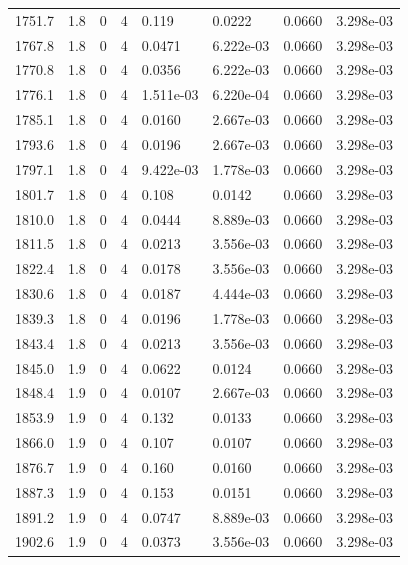 \documentclass[preview]{standalone}
\begin{document}
{{{{{{{{{{\begin{tabular}{L{1.2cm}C{1.2cm} C{0.3cm}C{0.5cm} C{1.4cm}C{1.4cm} C{1.4cm}C{1.4cm}}
  1751.7  &   1.8  & 0     &  4 &  0.119  & 0.0222  & 0.0660 &  3.298e-03   \\ 
  1767.8  &   1.8  & 0     &  4 &  0.0471  & 6.222e-03  & 0.0660 &  3.298e-03   \\ 
  1770.8  &   1.8  & 0     &  4 &  0.0356  & 6.222e-03  & 0.0660 &  3.298e-03   \\ 
  1776.1  &   1.8  & 0     &  4 &  1.511e-03  & 6.220e-04  & 0.0660 &  3.298e-03   \\ 
  1785.1  &   1.8  & 0     &  4 &  0.0160  & 2.667e-03  & 0.0660 &  3.298e-03   \\ 
  1793.6  &   1.8  & 0     &  4 &  0.0196  & 2.667e-03  & 0.0660 &  3.298e-03   \\ 
  1797.1  &   1.8  & 0     &  4 &  9.422e-03  & 1.778e-03  & 0.0660 &  3.298e-03   \\ 
  1801.7  &   1.8  & 0     &  4 &  0.108  & 0.0142  & 0.0660 &  3.298e-03   \\ 
  1810.0  &   1.8  & 0     &  4 &  0.0444  & 8.889e-03  & 0.0660 &  3.298e-03   \\ 
  1811.5  &   1.8  & 0     &  4 &  0.0213  & 3.556e-03  & 0.0660 &  3.298e-03   \\ 
  1822.4  &   1.8  & 0     &  4 &  0.0178  & 3.556e-03  & 0.0660 &  3.298e-03   \\ 
  1830.6  &   1.8  & 0     &  4 &  0.0187  & 4.444e-03  & 0.0660 &  3.298e-03   \\ 
  1839.3  &   1.8  & 0     &  4 &  0.0196  & 1.778e-03  & 0.0660 &  3.298e-03   \\ 
  1843.4  &   1.8  & 0     &  4 &  0.0213  & 3.556e-03  & 0.0660 &  3.298e-03   \\ 
  1845.0  &   1.9  & 0     &  4 &  0.0622  & 0.0124  & 0.0660 &  3.298e-03   \\ 
  1848.4  &   1.9  & 0     &  4 &  0.0107  & 2.667e-03  & 0.0660 &  3.298e-03   \\ 
  1853.9  &   1.9  & 0     &  4 &  0.132  & 0.0133  & 0.0660 &  3.298e-03   \\ 
  1866.0  &   1.9  & 0     &  4 &  0.107  & 0.0107  & 0.0660 &  3.298e-03   \\ 
  1876.7  &   1.9  & 0     &  4 &  0.160  & 0.0160  & 0.0660 &  3.298e-03   \\ 
  1887.3  &   1.9  & 0     &  4 &  0.153  & 0.0151  & 0.0660 &  3.298e-03   \\ 
  1891.2  &   1.9  & 0     &  4 &  0.0747  & 8.889e-03  & 0.0660 &  3.298e-03   \\ 
  1902.6  &   1.9  & 0     &  4 &  0.0373  & 3.556e-03  & 0.0660 &  3.298e-03   \\ 

\end{tabular}}}}}}}}}}}
\end{document}
